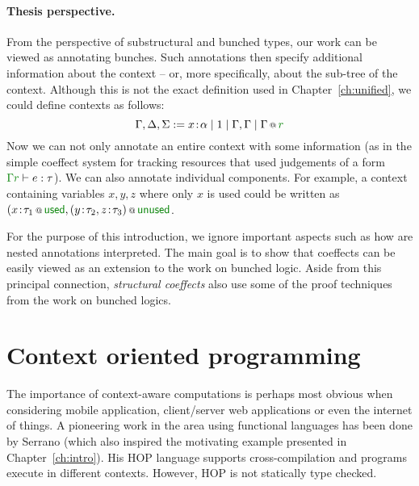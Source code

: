 \paragraph{Thesis perspective.}

From the perspective of substructural and bunched types, our work can be viewed as annotating 
bunches. Such annotations then specify additional information about the context -- or, more
specifically, about the sub-tree of the context. Although this is not the exact definition used in 
Chapter~\ref{ch:unified}, we could define contexts as follows:
%
\begin{equation*}
\Gamma, \Delta, \Sigma := x\!:\!\alpha \sep 1 \sep \Gamma, \Gamma \sep \coctx{\Gamma}{\cclrd{r}}
\end{equation*}
%
Now we can not only annotate an entire context with some information (as in the simple coeffect
system for tracking resources that used judgements of a form $\cclrd{\Gamma}{\cclrd{r}} \vdash e : \tau$).
We can also annotate individual components. For example, a context containing variables $x,y,z$
where only $x$ is used could be written as $\coctx{(x\!:\!\tau_1}{\ident{\cclrd{used}}}, \coctx{(y\!:\!\tau_2, z\!:\!\tau_3)}{\ident{\cclrd{unused}}}$.

For the purpose of this introduction, we ignore important aspects such as how are nested annotations
interpreted. The main goal is to show that coeffects can be easily viewed as an extension to the 
work on bunched logic. Aside from this principal connection, \emph{structural coeffects} also 
use some of the proof techniques from the work on bunched logics.



\section{Context oriented programming}

The importance of context-aware computations is perhaps most obvious when considering mobile
application, client/server web applications or even the internet of things. A pioneering work
in the area using functional languages has been done by Serrano \cite{app-hop-diffuse,app-hop-lang}
(which also inspired the motivating example presented in Chapter~\ref{ch:intro}). His HOP language supports 
cross-compilation and programs execute in different contexts. However, HOP is not statically 
type checked.

